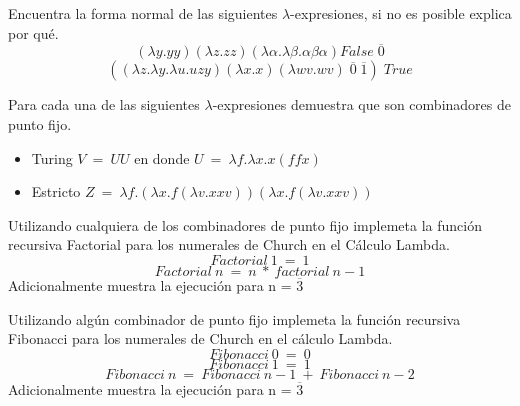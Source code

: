                 \begin{exercise}
                    Encuentra la forma normal de las siguientes $\lambda$-expresiones, si no es posible explica por qué.\\
                    \[
                        (\lambda y.yy)(\lambda z.zz)(\lambda \alpha . \lambda \beta . \alpha \beta \alpha) False \; \overline{0}
                    \]
                    \[
                        ((\lambda z. \lambda y. \lambda u.uzy)(\lambda x.x)(\lambda wv.wv) \; \overline{0} \; \overline{1}) \; True 
                    \]
                \end{exercise}

                \begin{exercise}
                    Para cada una de las siguientes $\lambda$-expresiones demuestra que son combinadores de punto fijo.\\
                    
                    \begin{itemize}
                        \item Turing $V\ =\ UU$ en donde $U\ =\ \lambda f.\lambda x.x(ffx)$
                        \item Estricto $Z\ =\ \lambda f.(\lambda x.f(\lambda v.xxv))(\lambda x.f(\lambda v.xxv))$
                    \end{itemize}
                    
                \end{exercise}

                \begin{exercise}
                    Utilizando cualquiera de los combinadores de punto fijo implemeta la función recursiva Factorial para los numerales de Church en el Cálculo Lambda.
                    \[ Factorial\ 1\ =\ 1 \]
                    \[ Factorial\ n\ =\ n\ *\ factorial\ n-1\]
                    Adicionalmente muestra la ejecución para n = $\overline{3}$
                \end{exercise}

                \begin{exercise}
                    Utilizando algún combinador de punto fijo implemeta la función recursiva Fibonacci para los numerales de Church en el cálculo Lambda.
                    \[ Fibonacci\ 0\ =\ 0 \]
                    \[ Fibonacci\ 1\ =\ 1 \]
                    \[ Fibonacci\ n\ =\ Fibonacci\ n-1\ +\ Fibonacci\ n-2\]
                    Adicionalmente muestra la ejecución para n = $\overline{3}$
                \end{exercise}

